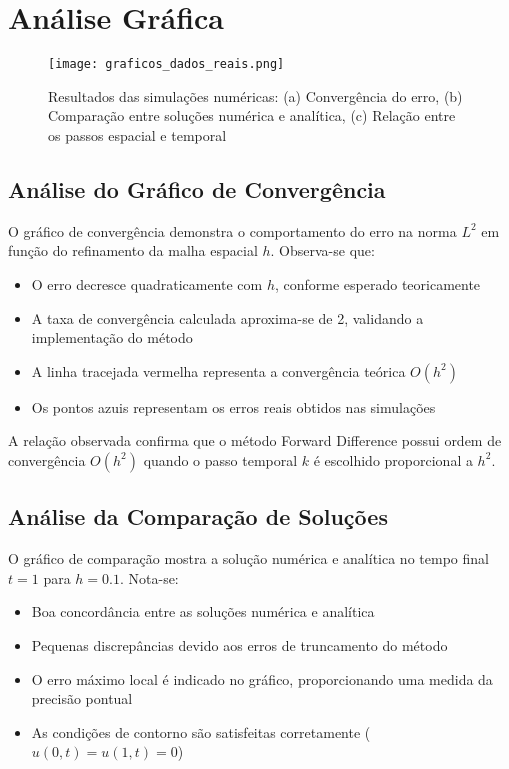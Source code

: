\documentclass[a4paper, 12pt]{article}
\begin{document}
\section{Análise Gráfica}

\begin{figure}[H]
\centering
\texttt{[image: graficos\_dados\_reais.png]}
\caption{Resultados das simulações numéricas: (a) Convergência do erro, (b) Comparação entre soluções numérica e analítica, (c) Relação entre os passos espacial e temporal}
\label{fig:resultados}
\end{figure}

\subsection{Análise do Gráfico de Convergência}

O gráfico de convergência demonstra o comportamento do erro na norma $L^2$ em função do refinamento da malha espacial $h$. Observa-se que:

\begin{itemize}
    \item O erro decresce quadraticamente com $h$, conforme esperado teoricamente
    \item A taxa de convergência calculada aproxima-se de 2, validando a implementação do método
    \item A linha tracejada vermelha representa a convergência teórica $O(h^2)$
    \item Os pontos azuis representam os erros reais obtidos nas simulações
\end{itemize}

A relação observada confirma que o método Forward Difference possui ordem de convergência $O(h^2)$ quando o passo temporal $k$ é escolhido proporcional a $h^2$.

\subsection{Análise da Comparação de Soluções}

O gráfico de comparação mostra a solução numérica e analítica no tempo final $t = 1$ para $h = 0.1$. Nota-se:

\begin{itemize}
    \item Boa concordância entre as soluções numérica e analítica
    \item Pequenas discrepâncias devido aos erros de truncamento do método
    \item O erro máximo local é indicado no gráfico, proporcionando uma medida da precisão pontual
    \item As condições de contorno são satisfeitas corretamente ($u(0,t) = u(1,t) = 0$)
\end{itemize}
\end{document}
